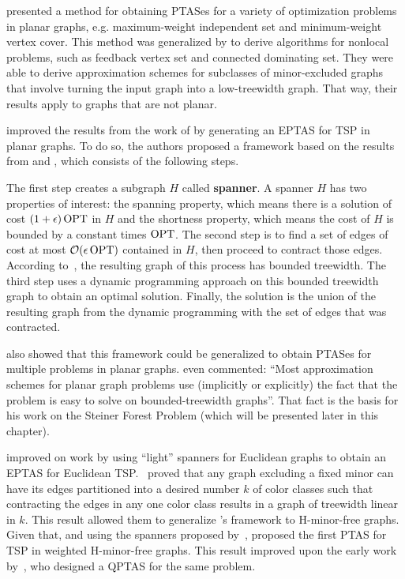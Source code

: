 \cite{baker1994} presented a method for obtaining PTASes for a variety of optimization problems in planar graphs, e.g. maximum-weight independent set and minimum-weight vertex cover. This method was generalized by \cite{demaine2005} to derive algorithms for nonlocal problems, such as feedback vertex set and connected dominating set. They were able to derive approximation schemes for subclasses of minor-excluded graphs that involve turning the input graph into a low-treewidth graph. That way, their results apply to graphs that are not planar.

\cite{KleinTSP} improved the results from the work of \cite{basicPTASplanarTSP} by generating an EPTAS for TSP in planar graphs. 
To do so, the authors proposed a framework based on the results from \cite{baker1994} and \cite{demaine2005}, which consists of the following steps.

The first step creates a subgraph \(H\) called \textbf{spanner}.
A spanner \(H\) has two properties of interest: the spanning property, which means there is a solution of cost \((1 + \epsilon) \operatorname{\textrm{OPT}}\) in \(H\) and the shortness property, which means the cost of \(H\) is bounded by a constant times \(\operatorname{\textrm{OPT}}\). The second step is to find a set of edges of cost at most \(\mathcal{O}(\epsilon \operatorname{\textrm{OPT}})\) contained in \(H\), then proceed to contract those edges. According to~\cite{Demaine2010}, the resulting graph of this process has bounded treewidth. The third step uses a dynamic programming approach on this bounded treewidth graph to obtain an optimal solution. Finally, the solution is the union of the resulting graph from the dynamic programming with the set of edges that was contracted.

\cite{KleinTSP} also showed that this framework could be generalized to obtain PTASes for multiple problems in planar graphs. \cite{Bateni} even commented: ``Most approximation schemes for planar graph problems use (implicitly or explicitly) the fact that the problem is easy to solve on bounded-treewidth graphs''. That fact is the basis for his work on the Steiner Forest Problem (which will be presented later in this chapter).

\cite{EPTASeuclidianTSP} improved on \cite{PTASeuclidianTSP} work by using ``light'' spanners for Euclidean graphs to obtain an EPTAS for Euclidean TSP.~\cite{contraction-decomposition-in-h-minor-free-graphs} proved that any graph excluding a fixed minor can have its edges partitioned into a desired number \(k\) of color classes such that contracting the edges in any one color class results in a graph of treewidth linear in \(k\). This result allowed them to generalize \citeauthor{KleinTSP}'s framework to H-minor-free graphs. Given that, and using the spanners proposed by~\cite{light_spanners_tsp}, \citeauthor{contraction-decomposition-in-h-minor-free-graphs} proposed the first PTAS for TSP in weighted H-minor-free graphs. This result improved upon the early work by~\cite{light_spanners_tsp}, who designed a QPTAS for the same problem.

